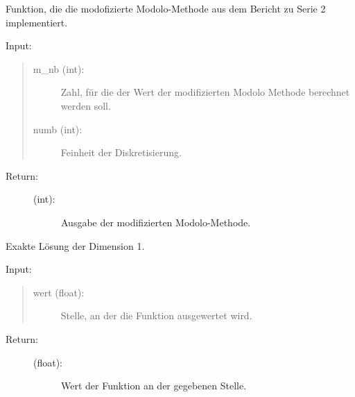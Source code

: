 \documentclass[letterpaper,10pt,ngerman, oneside, openright]{sphinxmanual}
\begin{document}

\begin{fulllineitems}
\label{\detokenize{index:aufg_5_2.modo}}
Funktion, die die modofizierte Modolo-Methode aus dem Bericht zu Serie 2 implementiert.
\begin{description}
\item [{Input:}]
\end{description}
\begin{quote}
\begin{description}
\item[{m\_nb (int):}] \leavevmode
Zahl, für die der Wert der modifizierten Modolo Methode berechnet werden soll.

\item[{numb (int):}] \leavevmode
Feinheit der Diskretisierung.

\end{description}
\end{quote}
\begin{description}
\item[{Return:}] \leavevmode\begin{description}
\item[{(int):}] \leavevmode
Ausgabe der modifizierten Modolo-Methode.

\end{description}

\end{description}

\end{fulllineitems}


\begin{fulllineitems}
\label{\detokenize{index:aufg_5_2.ulsg1}}
Exakte Lösung der Dimension 1.
\begin{description}
\item [{Input:}]
\end{description}
\begin{quote}
\begin{description}
\item[{wert (float):}] \leavevmode
Stelle, an der die Funktion ausgewertet wird.

\end{description}
\end{quote}
\begin{description}
\item[{Return:}] \leavevmode\begin{description}
\item[{(float):}] \leavevmode
Wert der Funktion an der gegebenen Stelle.

\end{description}

\end{description}

\end{fulllineitems}
\end{document}
